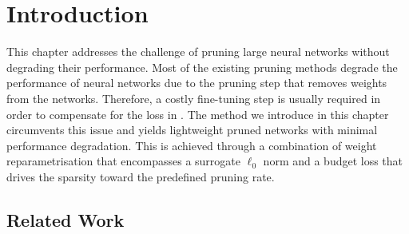 \section{Introduction}

This chapter addresses the challenge of pruning large neural networks without
degrading their performance. Most of the existing pruning methods degrade the
performance of neural networks due to the pruning step that removes weights from
the networks. Therefore, a costly fine-tuning step is usually required in order
to compensate for the loss in \DIFdelbegin {}\DIFdelend \DIFaddbegin {}\DIFaddend . The method we introduce in this
chapter circumvents this issue and yields lightweight pruned networks with
minimal performance degradation. This is achieved through a combination of
weight reparametrisation that encompasses a surrogate $\ell_0$ norm and a budget
loss that drives the sparsity toward the predefined pruning rate.



\subsection{Related Work}

